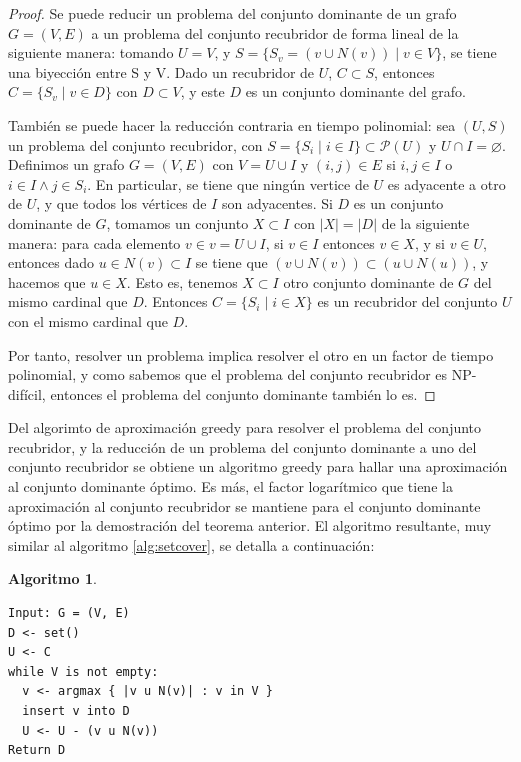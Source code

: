 \documentclass[a4paper,12pt]{report}
\theoremstyle{definition}
\newtheorem{alg}{Algoritmo}
\begin{document}
\begin{proof}
  Se puede reducir un problema del conjunto dominante de un grafo $G = (V, E)$ a un problema del conjunto recubridor de forma lineal de la siguiente manera: tomando $U=V$, y $S = \lbrace S_v = (v \cup N(v)) \mid v \in V \rbrace$, se tiene una biyección entre S y V. Dado un recubridor de $U$, $C \subset S$, entonces $C = \lbrace S_v \mid v \in D \rbrace$ con $D \subset V$, y este $D$ es un conjunto dominante del grafo.

  También se puede hacer la reducción contraria en tiempo polinomial: sea $(U, S)$ un problema del conjunto recubridor, con $S = \lbrace S_i \mid i \in I \rbrace \subset \mathcal{P}(U)$ y $U \cap I = \varnothing$. Definimos un grafo $G = (V, E)$ con $V = U \cup I$ y $(i,j) \in E$ si $i,j \in I$ o $i \in I \wedge j \in S_i$.
  En particular, se tiene que ningún vertice de $U$ es adyacente a otro de $U$, y que todos los vértices de $I$ son adyacentes.
  Si $D$ es un conjunto dominante de $G$, tomamos un conjunto $X \subset I$ con $\lvert X \rvert = \lvert D \rvert$ de la siguiente manera: para cada elemento $v \in v = U \cup I$, si $v \in I$ entonces $v \in X$, y si $v \in U$, entonces dado $u \in N(v) \subset I$ se tiene que $(v \cup N(v)) \subset (u \cup N(u))$, y hacemos que $u \in X$. Esto es, tenemos $X \subset I$ otro conjunto dominante de $G$ del mismo cardinal que $D$. Entonces $C = \lbrace S_i \mid i \in X \rbrace$ es un recubridor del conjunto $U$ con el mismo cardinal que $D$.

  Por tanto, resolver un problema implica resolver el otro en un factor de tiempo polinomial, y como sabemos que el problema del conjunto recubridor es NP-difícil, entonces el problema del conjunto dominante también lo es.
\end{proof}

Del algorimto de aproximación greedy para resolver el problema del conjunto recubridor, y la reducción de un problema del conjunto dominante a uno del conjunto recubridor se obtiene un algoritmo greedy para hallar una aproximación al conjunto dominante óptimo. Es más, el factor logarítmico que tiene la aproximación al conjunto recubridor se mantiene para el conjunto dominante óptimo por la demostración del teorema anterior. El algoritmo resultante, muy similar al algoritmo \ref{alg:setcover}, se detalla a continuación:

\begin{alg}
  \label{alg:dominatingset}
\begin{verbatim}
Input: G = (V, E)
D <- set()
U <- C
while V is not empty:
  v <- argmax { |v u N(v)| : v in V }
  insert v into D
  U <- U - (v u N(v))
Return D
\end{verbatim}
\end{alg}
\end{document}
